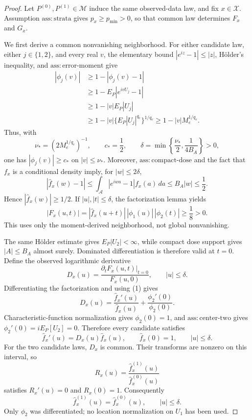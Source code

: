 \documentclass{article}
\begin{document}
\begin{proof}
Let \(P^{(0)},P^{(1)}\in\mathcal M\) induce the same observed-data law, and
fix \(x\in\mathcal X\).  Assumption \(\mathrm{ass{:}strata}\) gives
\(p_x\ge p_{\min}>0\), so that common law determines \(F_x\) and \(G_x\).

We first derive a common nonvanishing neighborhood.  For either candidate
law, either \(j\in\{1,2\}\), and every real \(v\), the elementary bound
\(|e^{iz}-1|\le|z|\), H\"older's inequality, and
\(\mathrm{ass{:}error\text{-}moment}\) give
\[
\begin{aligned}
 |\phi_j(v)|
 &\ge1-|\phi_j(v)-1|\\
 &\ge1-E_P|e^{ivU_j}-1|\\
 &\ge1-|v|E_P|U_j|\\
 &\ge1-|v|\{E_P|U_j|^{q_e}\}^{1/q_e}
 \ge1-|v|M_e^{1/q_e}.
\end{aligned}
\]
Thus, with
\[
 \nu_*=(2M_e^{1/q_e})^{-1},\qquad c_*=\frac12,
 \qquad
 \delta=\min\left\{\frac{\nu_*}{2},\frac{1}{4B_A}\right\}>0,
\]
one has \(|\phi_j(v)|\ge c_*\) on \(|v|\le\nu_*\).  Moreover,
\(\mathrm{ass{:}compact\text{-}dose}\) and the fact that \(f_x\) is a
conditional density imply, for \(|w|\le2\delta\),
\[
 |\widehat f_x(w)-1|
 \le\int_{\mathcal A}|e^{iwa}-1|f_x(a)\,da
 \le B_A|w|\le\frac12.
\]
Hence \(|\widehat f_x(w)|\ge1/2\).  If \(|u|,|t|\le\delta\), the
factorization lemma yields
\[
 |F_x(u,t)|
 =|\widehat f_x(u+t)|\,|\phi_1(u)|\,|\phi_2(t)|
 \ge\frac18>0.                                                    \tag{1}
\]
This uses only the moment-derived neighborhood, not global nonvanishing.

The same H\"older estimate gives \(E_P|U_2|<\infty\), while compact dose support
gives \(|A|\le B_A\) almost surely.  Dominated differentiation is therefore
valid at \(t=0\).  Define the observed logarithmic derivative
\[
 D_x(u)=
 \frac{\left.\partial_tF_x(u,t)\right|_{t=0}}{F_x(u,0)},
 \qquad |u|\le\delta.
\]
Differentiating the factorization and using (1) gives
\[
 D_x(u)=\frac{\widehat f_x'(u)}{\widehat f_x(u)}
       +\frac{\phi_2'(0)}{\phi_2(0)}.
\]
Characteristic-function normalization gives \(\phi_2(0)=1\), and
\(\mathrm{ass{:}center\text{-}two}\) gives
\(\phi_2'(0)=iE_P[U_2]=0\).  Therefore every candidate satisfies
\[
 \widehat f_x'(u)=D_x(u)\widehat f_x(u),
 \qquad \widehat f_x(0)=1,
 \qquad |u|\le\delta.                                            \tag{2}
\]
For the two candidate laws, \(D_x\) is common.  Their transforms are
nonzero on this interval, so
\[
 R_x(u)=\frac{\widehat f_x^{(1)}(u)}{\widehat f_x^{(0)}(u)}
\]
satisfies \(R_x'(u)=0\) and \(R_x(0)=1\).  Consequently
\[
 \widehat f_x^{(1)}(u)=\widehat f_x^{(0)}(u),
 \qquad |u|\le\delta.                                            \tag{3}
\]
Only \(\phi_2\) was differentiated; no location normalization on \(U_1\)
has been used.


\end{proof}
\end{document}
